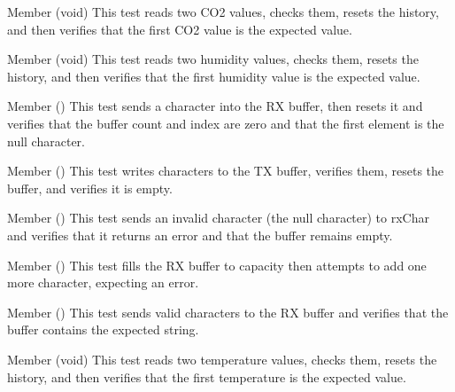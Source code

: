 \begin{DoxyRefList}
\item[Member \doxylink{test_8c_a864051f61e6e76036fe5ba9c1dad8ed2}{test\+\_\+co2\+\_\+ler\+\_\+co2\+\_\+e\+\_\+reset} (void)]\label{test__test000015}%
%
This test reads two CO2 values, checks them, resets the history, and then verifies that the first CO2 value is the expected value.  
\item[Member \doxylink{test_8c_a10095a744244683fdc48b7d17436c1ae}{test\+\_\+humidity\+\_\+ler\+\_\+hums\+\_\+e\+\_\+reset} (void)]\label{test__test000014}%
%
This test reads two humidity values, checks them, resets the history, and then verifies that the first humidity value is the expected value.  
\item[Member \doxylink{test_8c_a251055cd936f00cdcf7ca42de5b76e7d}{test\+\_\+reset\+Rx\+Buffer} ()]\label{test__test000001}%
%
This test sends a character into the RX buffer, then resets it and verifies that the buffer count and index are zero and that the first element is the null character.  
\item[Member \doxylink{test_8c_a092218b17bb049bd11cb0fce2557528d}{test\+\_\+reset\+Tx\+Buffer} ()]\label{test__test000005}%
%
This test writes characters to the TX buffer, verifies them, resets the buffer, and verifies it is empty.  
\item[Member \doxylink{test_8c_aeac96837e810e7e08f471975520d5fe3}{test\+\_\+rx\+Char\+\_\+invalido} ()]\label{test__test000003}%
%
This test sends an invalid character (the null character) to rx\+Char and verifies that it returns an error and that the buffer remains empty.  
\item[Member \doxylink{test_8c_aedae2008a79e95983a2ff595257cb17b}{test\+\_\+rx\+Char\+\_\+overflow} ()]\label{test__test000004}%
%
This test fills the RX buffer to capacity then attempts to add one more character, expecting an error.  
\item[Member \doxylink{test_8c_afc3841d181cf953d3538c40488c6c07c}{test\+\_\+rx\+Char\+\_\+valido} ()]\label{test__test000002}%
%
This test sends valid characters to the RX buffer and verifies that the buffer contains the expected string.  
\item[Member \doxylink{test_8c_a9457bcd5ddfd0ab23937e02139cf610b}{test\+\_\+temperature\+\_\+ler\+\_\+temps\+\_\+e\+\_\+reset} (void)]\label{test__test000013}%
%
This test reads two temperature values, checks them, resets the history, and then verifies that the first temperature is the expected value.  

\end{DoxyRefList}
